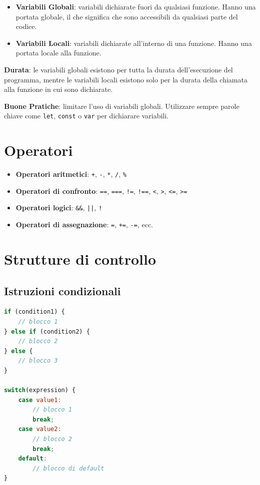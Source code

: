 \begin{itemize}
    \item \textbf{Variabili Globali}: variabili dichiarate fuori da qualsiasi funzione. Hanno una portata globale, il che significa che sono accessibili da qualsiasi parte del codice.
    \item \textbf{Variabili Locali}: variabili dichiarate all'interno di una funzione. Hanno una portata locale alla funzione.
\end{itemize}

\textbf{Durata}: le variabili globali esistono per tutta la durata dell'esecuzione del programma, mentre le variabili locali esistono solo per la durata della chiamata alla funzione in cui sono dichiarate.

\textbf{Buone Pratiche}: limitare l'uso di variabili globali. Utilizzare sempre parole chiave come \texttt{let}, \texttt{const} o \texttt{var} per dichiarare variabili.

\section{Operatori}

\begin{itemize}
    \item \textbf{Operatori aritmetici}: \texttt{+}, \texttt{-}, \texttt{*}, \texttt{/}, \texttt{\%}
    \item \textbf{Operatori di confronto}: \texttt{==}, \texttt{===}, \texttt{!=}, \texttt{!==}, \texttt{<}, \texttt{>}, \texttt{<=}, \texttt{>=}
    \item \textbf{Operatori logici}: \texttt{\&\&}, \texttt{||}, \texttt{!}
    \item \textbf{Operatori di assegnazione}: \texttt{=}, \texttt{+=}, \texttt{-=}, ecc.
\end{itemize}

\section{Strutture di controllo}

\subsection{Istruzioni condizionali}

\begin{lstlisting}[language=JavaScript]
if (condition1) {
    // blocco 1
} else if (condition2) {
    // blocco 2
} else {
    // blocco 3
}

switch(expression) {
    case value1:
        // blocco 1
        break;
    case value2:
        // blocco 2
        break;
    default:
        // blocco di default
}
\end{lstlisting}

